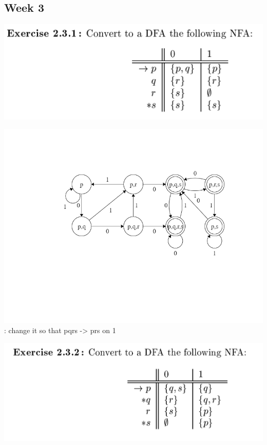 \documentclass{article}
\theoremstyle{theorem}
\theoremstyle{definition}
\theoremstyle{remark}
\begin{document}
\subsection{Week 3}

\includegraphics[scale=0.2]{Images/Week3.png}

\includegraphics[scale=0.4]{Images/2.3.1.png} : change it so that pqrs -> prs on 1

\includegraphics[scale=0.2]{Images/Week3a.png}
\end{document}
